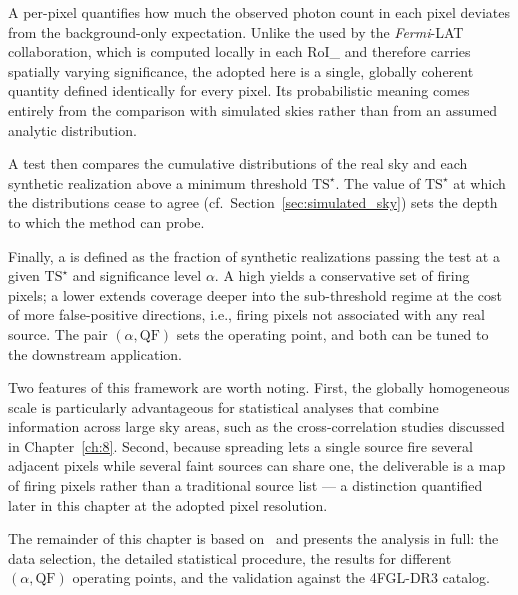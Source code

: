 A per-pixel \TS quantifies how much the observed photon count in each pixel deviates from the background-only expectation.
Unlike the \TS used by the \textit{Fermi}-LAT collaboration, which is computed locally in each \gls{RoI_} and therefore carries spatially varying significance, the \TS adopted here is a single, globally coherent quantity defined identically for every pixel.
Its probabilistic meaning comes entirely from the comparison with simulated skies rather than from an assumed analytic distribution.

A \KS test then compares the cumulative \TS distributions of the real sky and each synthetic realization above a minimum threshold $\mathrm{TS}^\star$.
The value of $\mathrm{TS}^\star$ at which the distributions cease to agree (cf.\ Section~\ref{sec:simulated_sky}) sets the depth to which the method can probe.

Finally, a \QF is defined as the fraction of synthetic realizations passing the \KS test at a given $\mathrm{TS}^\star$ and significance level $\alpha$.
A high \QF yields a conservative set of firing pixels; a lower \QF extends coverage deeper into the sub-threshold regime at the cost of more false-positive directions, i.e., firing pixels not associated with any real source.
The pair $(\alpha, \mathrm{QF})$ sets the operating point, and both can be tuned to the downstream application.

Two features of this framework are worth noting.
First, the globally homogeneous \TS scale is particularly advantageous for statistical analyses that combine information across large sky areas, such as the cross-correlation studies discussed in Chapter~\ref{ch:8}.
Second, because \PSF spreading lets a single source fire several adjacent pixels while several faint sources can share one, the deliverable is a map of firing pixels rather than a traditional source list --- a distinction quantified later in this chapter at the adopted pixel resolution.

The remainder of this chapter is based on~\cite{Amerio:2023rjn} and presents the analysis in full: the data selection, the detailed statistical procedure, the results for different $(\alpha, \mathrm{QF})$ operating points, and the validation against the 4FGL-DR3 catalog.
